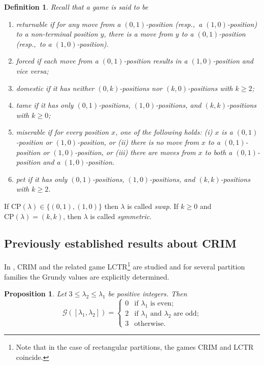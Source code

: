 \documentclass[pdflatex,sn-mathphys-num]{sn-jnl}%
\theoremstyle{thmstyleone}%
\newtheorem{proposition}[theorem]{Proposition}%
\theoremstyle{thmstyletwo}%
\theoremstyle{thmstylethree}%
\newtheorem{definition}{Definition}%
\newcommand{\sg}{\mathcal{G}}
\newcommand{\crim}{\textsc{CRIM} \/}
\newcommand{\cp}{\mathrm{CP}}
\begin{document}
\begin{definition} \label{D.DTP}
Recall that a game is said to be \begin{enumerate} 
\item {\em returnable} if for any move from a $(0,1)$-position (resp.,~a $(1,0)$-position) to a non-terminal position $y$, there is a move from $y$ to a $(0,1)$-position (resp.,~to a $(1,0)$-position).
\item {\em forced} if each move from a $(0,1)$-position results in a $(1,0)$-position and vice versa;
\item {\em domestic} if it has neither $(0,k)$-positions nor $(k,0)$-positions with $k \geq 2$;
\item {\em tame} if it has only $(0,1)$-positions, $(1,0)$-positions, and $(k,k)$-positions with $k \geq 0$;
\item  {\em miserable} if for every position $x$, one of the following holds: (i) $x$ is a $(0, 1)$-position or $(1,0)$-position, or (ii) there is no move from $x$ to a $(0,1)$-position or $(1, 0)$-position, or (iii) there are moves from $x$ to both a $(0, 1)$-position and a $(1, 0)$-position.
\item {\em pet} if it has only $(0,1)$-positions, $(1,0)$-positions, and $(k,k)$-positions with $k \geq 2$.
 \end{enumerate}
\end{definition}
 If $\cp(\lambda) \in \{(0, 1), (1, 0)\}$ then $\lambda$ is called \emph{swap}. If $k \geq 0$ and $\cp(\lambda) = (k, k)$, then $\lambda$ is called \emph{symmetric}.

\subsection{Previously established results about \crim} \label{sec:SG}
In \cite{basic2022some,Basic_2023,Ilic2019,GKM22LCTR}, CRIM and the related game LCTR\footnote{Note that in the case of rectangular partitions, the games CRIM and LCTR coincide.} are studied and for several partition families the Grundy values are explicitly determined. 

\begin{proposition}
\label{lem:bordercase_a2}
    Let $3\le \lambda_2\le \lambda_1$ be positive integers.
    Then 
    $$\sg \left([\lambda_1,\lambda_2]\right) = 
\begin{cases}
0 &  \text{if $\lambda_1$ is even; }\\
2 & \text{if $\lambda_1$ and $\lambda_2$ are odd;} \\
3 & \text{otherwise.}
\end{cases}$$
\end{proposition}
\end{document}
